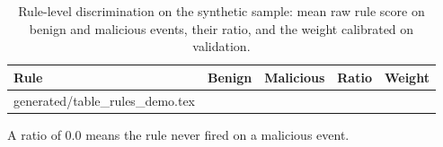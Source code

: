 \documentclass[11pt,a4paper]{article}
\makeatletter
\newcommand{\tablerows}[1]{\@@input #1 }
\makeatother
\begin{document}
\begin{table}[H]
\centering
\small
\begin{threeparttable}
\caption{Rule-level discrimination on the synthetic sample: mean raw rule score on benign and malicious events, their ratio, and the weight calibrated on validation.}
\label{tab:rules}
\begin{tabular}{@{}lrrrr@{}}
\toprule
Rule & Benign & Malicious & Ratio & Weight \\
\midrule
\tablerows{generated/table_rules_demo.tex}
\bottomrule
\end{tabular}
\begin{tablenotes}\footnotesize
\item A ratio of 0.0 means the rule never fired on a malicious event.
\end{tablenotes}
\end{threeparttable}
\end{table}
\end{document}
